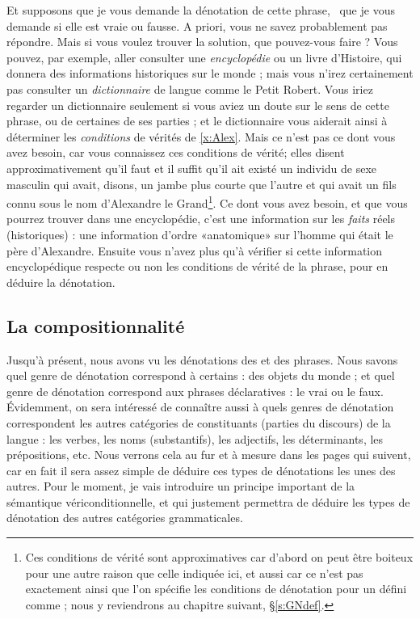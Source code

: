 Et supposons que je vous demande la dénotation de cette phrase, \ie\ que
je vous demande si elle est vraie ou fausse.  {A priori}, vous ne
savez probablement pas répondre. Mais si vous voulez trouver la
solution, que pouvez-vous faire ? Vous pouvez, par exemple, aller
consulter une \emph{encyclopédie} ou un livre d'Histoire, qui donnera
des informations historiques sur le monde ; mais vous n'irez certainement pas
consulter un \emph{dictionnaire} de langue comme le Petit Robert.  Vous iriez
regarder un dictionnaire seulement si vous aviez un doute sur le sens
de cette phrase, ou de certaines de ses parties ; et le dictionnaire
vous aiderait ainsi à déterminer les \emph{conditions} de vérités de
\ref{x:Alex}.   Mais ce n'est pas ce dont vous avez besoin, car vous
connaissez ces conditions de vérité; elles disent approximativement
qu'il faut et il 
suffit qu'il ait existé un individu de sexe masculin qui avait,
disons, un jambe plus courte que l'autre et qui avait un fils connu
sous le nom d'Alexandre le Grand\footnote{Ces conditions de vérité
  sont approximatives car d'abord on peut être boiteux pour une autre
  raison que celle indiquée ici, et aussi car ce n'est pas exactement
  ainsi que l'on spécifie les conditions de dénotation pour un {\GN}
  défini comme  ; nous y reviendrons au chapitre
  suivant, \S\ref{s:GNdef}.}.
Ce dont vous avez besoin, et que vous
pourrez trouver dans une encyclopédie, c'est une information sur les
\emph{faits} réels (historiques) : une information d'ordre
«anatomique» sur l'homme qui était le père d'Alexandre.  Ensuite
vous n'avez plus qu'à vérifier si cette information encyclopédique
respecte ou non les conditions de vérité de la phrase, pour en déduire
la dénotation.



\subsection{La compositionnalité}

Jusqu'à présent, nous avons vu les dénotations des {\GN} et des phrases.
Nous savons quel genre de dénotation correspond à certains
{\GN} : des objets du monde ; et quel genre de dénotation correspond aux
phrases déclaratives : le vrai ou le faux.  Évidemment, on sera intéressé de
connaître aussi à quels genres de dénotation correspondent les autres
catégories de constituants (parties du discours) de la langue : les
verbes, les noms (substantifs), les adjectifs, les déterminants, les
prépositions, etc.   
Nous verrons cela au fur et à mesure dans les pages qui suivent, car
en fait il sera assez simple de déduire ces types de dénotations les
unes des autres.  Pour le moment, je vais introduire un principe
important de la sémantique vériconditionnelle, et qui justement
permettra de déduire les types de dénotation des autres catégories
grammaticales. 

